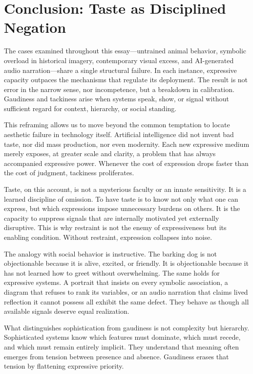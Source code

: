 \documentclass[12pt]{article}
\begin{document}
\section{Conclusion: Taste as Disciplined Negation}

The cases examined throughout this essay—untrained animal behavior, symbolic overload in historical imagery, contemporary visual excess, and AI-generated audio narration—share a single structural failure. In each instance, expressive capacity outpaces the mechanisms that regulate its deployment. The result is not error in the narrow sense, nor incompetence, but a breakdown in calibration. Gaudiness and tackiness arise when systems speak, show, or signal without sufficient regard for context, hierarchy, or social standing.

This reframing allows us to move beyond the common temptation to locate aesthetic failure in technology itself. Artificial intelligence did not invent bad taste, nor did mass production, nor even modernity. Each new expressive medium merely exposes, at greater scale and clarity, a problem that has always accompanied expressive power. Whenever the cost of expression drops faster than the cost of judgment, tackiness proliferates.

Taste, on this account, is not a mysterious faculty or an innate sensitivity. It is a learned discipline of omission. To have taste is to know not only what one can express, but which expressions impose unnecessary burdens on others. It is the capacity to suppress signals that are internally motivated yet externally disruptive. This is why restraint is not the enemy of expressiveness but its enabling condition. Without restraint, expression collapses into noise.

The analogy with social behavior is instructive. The barking dog is not objectionable because it is alive, excited, or friendly. It is objectionable because it has not learned how to greet without overwhelming. The same holds for expressive systems. A portrait that insists on every symbolic association, a diagram that refuses to rank its variables, or an audio narration that claims lived reflection it cannot possess all exhibit the same defect. They behave as though all available signals deserve equal realization.

What distinguishes sophistication from gaudiness is not complexity but hierarchy. Sophisticated systems know which features must dominate, which must recede, and which must remain entirely implicit. They understand that meaning often emerges from tension between presence and absence. Gaudiness erases that tension by flattening expressive priority.
\end{document}
